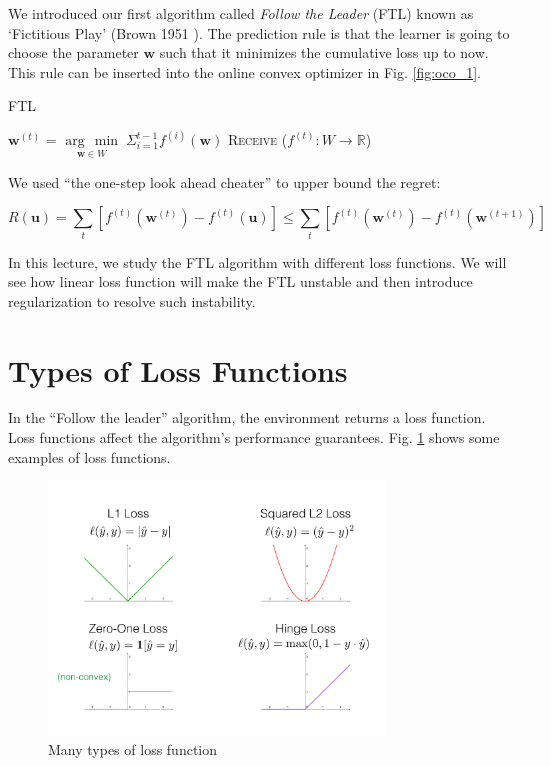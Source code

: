 \documentclass[11pt]{article}
\newcommand{\argmin}[1]{\underset{#1}{\operatorname{arg}\,\operatorname{min}}\;}
\begin{document}
We introduced our first algorithm called \textit{Follow the Leader} (FTL) known as `Fictitious Play' (Brown 1951 \cite{berger2007brown}). The prediction rule is that the learner is going to choose the parameter $\bm{w}$ such that it minimizes the cumulative loss up to now. This rule can be inserted into the online convex optimizer in Fig. \ref{fig:oco_1}.\\
\begin{algorithm}
  \caption{FTL}\label{euclid}
  \begin{algorithmic}[1]
            \State $\bm{w}^{(t)}$ = $\argmin{\bm{w} \in W} \Sigma^{t-1}_{i=1} f^{(i)} (\bm{w})$ 
            \State \textsc{Receive} ($f^{(t)} : W \rightarrow \mathbb{R}$) 
        \EndFor
    \EndFunction
  \end{algorithmic}
\end{algorithm}

We used ``the one-step look ahead cheater'' to upper bound the regret:   

\begin{equation*}
    R(\bm{u}) = \sum_{t}[f^{(t)}(\bm{w}^{(t)}) - f^{(t)}(\bm{u})] \leq \sum_{t}[f^{(t)}(\bm{w}^{(t)}) - f^{(t)}(\bm{w}^{(t+1)})]
\end{equation*}

In this lecture, we study the FTL algorithm with different loss functions. We will see how linear loss function will make the FTL unstable and then introduce regularization to resolve such instability.

\section{Types of Loss Functions}
In the ``Follow the leader'' algorithm, the environment returns a loss function. Loss functions affect the algorithm's performance guarantees. Fig. \ref{fig:zero_one_loss} shows some examples of loss functions.
\begin{figure}[h]
    \centering
    \includegraphics[width=0.8\textwidth]{figure/loss_func.pdf}
    \caption{Many types of loss function}
    \label{fig:zero_one_loss}
\end{figure}\\
\end{document}
